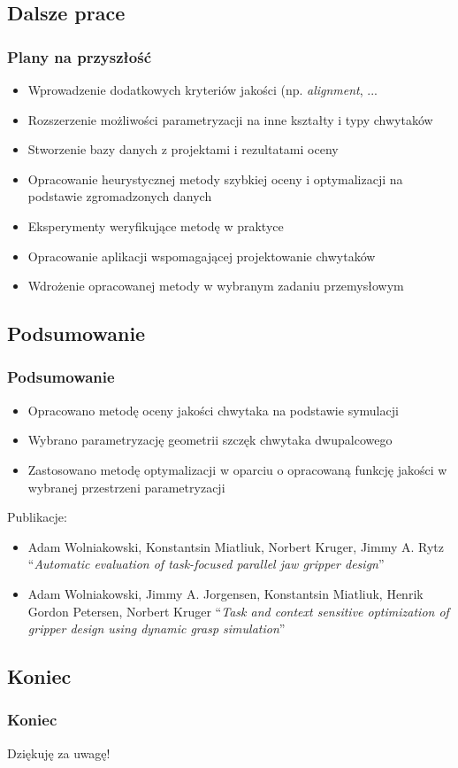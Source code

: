 \documentclass[12pt,a4paper,portrait]{beamer}
\begin{document}
\subsection{Dalsze prace}
\begin{frame}
\frametitle{Plany na przyszłość}
\begin{itemize}
\item Wprowadzenie dodatkowych kryteriów jakości (np. \textit{alignment}, ...
\item Rozszerzenie możliwości parametryzacji na inne kształty i typy chwytaków
\item Stworzenie bazy danych z projektami i rezultatami oceny
\item Opracowanie heurystycznej metody szybkiej oceny i optymalizacji na podstawie zgromadzonych danych
\item Eksperymenty weryfikujące metodę w praktyce
\item Opracowanie aplikacji wspomagającej projektowanie chwytaków
\item Wdrożenie opracowanej metody w wybranym zadaniu przemysłowym
\end{itemize}
\end{frame}

\subsection{Podsumowanie}
\begin{frame}
\frametitle{Podsumowanie}
\begin{itemize}
\item Opracowano metodę oceny jakości chwytaka na podstawie symulacji
\item Wybrano parametryzację geometrii szczęk chwytaka dwupalcowego
\item Zastosowano metodę optymalizacji w oparciu o opracowaną funkcję jakości w wybranej przestrzeni parametryzacji
\end{itemize}


Publikacje:
\begin{itemize}
\item Adam Wolniakowski, Konstantsin Miatliuk, Norbert Kruger, Jimmy A. Rytz ``\textit{Automatic evaluation of task-focused parallel jaw gripper design}''
\item Adam Wolniakowski, Jimmy A. Jorgensen, Konstantsin Miatliuk, Henrik Gordon Petersen, Norbert Kruger ``\textit{Task and context sensitive optimization of gripper design using dynamic grasp simulation}''
\end{itemize}
\end{frame}

\subsection{Koniec}
\begin{frame}
\frametitle{Koniec}
Dziękuję za uwagę!
\end{frame}
\end{document}
